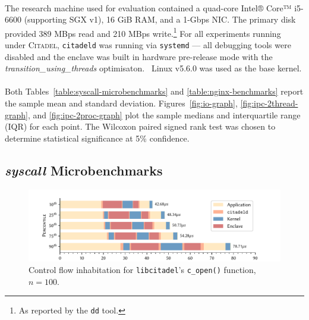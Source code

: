 \paragraph{} The research machine used for evaluation contained a quad-core Intel® Core™ i5-6600 (supporting SGX v1), 16 GiB RAM, and a 1-Gbps NIC. The primary disk provided 389 MBps read and 210 MBps write.\footnote{As reported by the \texttt{dd} tool.} For all experiments running under \textsc{Citadel}, \texttt{citadeld} was running via \texttt{systemd} --- all debugging tools were disabled and the enclave was built in hardware pre-release mode with the \textit{transition\_using\_threads} optimisaton.~\cite{sgx-switchless} Linux v5.6.0 was used as the base kernel.

\paragraph{} Both Tables~\ref{table:syscall-microbenchmarks} and \ref{table:nginx-benchmarks} report the sample mean and standard deviation. Figures~\ref{fig:io-graph}, \ref{fig:ipc-2thread-graph}, and \ref{fig:ipc-2proc-graph} plot the sample medians and interquartile range (IQR) for each point. The Wilcoxon paired signed rank test was chosen to determine statistical significance at 5\% confidence.~\cite{10.2307/3001968}

\subsection{\textit{syscall} Microbenchmarks}
\label{sec:syscall-microbenchmarks}

\begin{figure}[]
    \centering
    \includegraphics[width=\linewidth]{figures/graphs/open-anatomy.pdf}
    \vspace{-5mm}
    \caption{Control flow inhabitation for \texttt{libcitadel}'s \texttt{c\_open()} function, $n=100$.}
    \label{fig:open-anatomy}
\end{figure}


